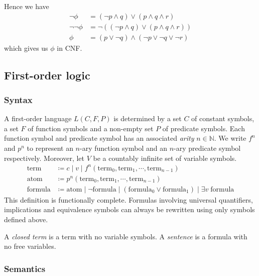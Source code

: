 Hence we have
%
\begin{align*}
    \neg\phi &= (\neg p \land q) \lor (p \land q \land r) \tag{DNF of \(\neg\phi\)}\\
    \neg\neg\phi &= \neg((\neg p \land q) \lor (p \land q \land r)) \tag{negating both sides}\\
    \phi &= (p \lor \neg q) \land (\neg p \lor \neg q \lor \neg r) \tag{double negation; De Morgan's laws}
\end{align*}
%
which gives us \(\phi\) in CNF.



\subsection{First-order logic}

\subsubsection{Syntax}

A first-order language \(L(C, F, P)\) is determined by a set \(C\) of constant symbols, a set \(F\) of function symbols and a non-empty set \(P\) of predicate symbols. Each function symbol and predicate symbol has an associated \emph{arity} \(n \in \mathbb{N}\). We write \(f^n\) and \(p^n\) to represent an \(n\)-ary function symbol and an \(n\)-ary predicate symbol respectively. Moreover, let \(V\) be a countably infinite set of variable symbols.
%
\begin{align*}
    \text{term} &\coloneq c \;\vert\; v \;\vert\; f^n (\text{term}_0, \text{term}_1, \cdots, \text{term}_{n-1}) \tag{where \(c \in C\), \(v \in V\) and \(f^n \in F\)}\\
    \text{atom} &\coloneq p^n (\text{term}_0, \text{term}_1, \cdots, \text{term}_{n-1}) \tag{where \(p^n \in P\)}\\
    \text{formula} &\coloneq \text{atom} \;\vert\; \neg \text{formula} \;\vert\; (\text{formula}_0 \lor \text{formula}_1) \;\vert\; \exists v\; \text{formula}  \tag{where \(v \in V\)}
\end{align*}
%
This definition is functionally complete. Formulas involving universal quantifiers, implications and equivalence symbols can always be rewritten using only symbols defined above.

A \emph{closed term} is a term with no variable symbols. A \emph{sentence} is a formula with no free variables.



\subsubsection{Semantics}

